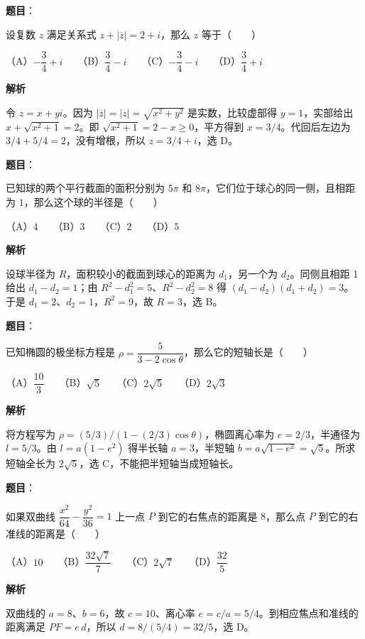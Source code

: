 \begin{answer}

\textbf{题目}：

设复数 $z$ 满足关系式 $z+|\overline z|=2+i$，那么 $z$ 等于\mbox{（　　）}

（A）$-\dfrac34+i$　　（B）$\dfrac34-i$　　（C）$-\dfrac34-i$　　（D）$\dfrac34+i$

\textbf{解析}

令 $z=x+yi$。因为 $|\overline z|=|z|=\sqrt{x^2+y^2}$ 是实数，比较虚部得 $y=1$，实部给出 $x+\sqrt{x^2+1}=2$。即 $\sqrt{x^2+1}=2-x\ge0$，平方得到 $x=3/4$。代回后左边为 $3/4+5/4=2$，没有增根，所以 $z=3/4+i$，选 D。


\end{answer}
\begin{answer}

\textbf{题目}：

已知球的两个平行截面的面积分别为 $5\pi$ 和 $8\pi$，它们位于球心的同一侧，且相距为 $1$，那么这个球的半径是\mbox{（　　）}

（A）$4$　　（B）$3$　　（C）$2$　　（D）$5$

\textbf{解析}

设球半径为 $R$，面积较小的截面到球心的距离为 $d_1$，另一个为 $d_2$。同侧且相距 1 给出 $d_1-d_2=1$；由 $R^2-d_1^2=5$、$R^2-d_2^2=8$ 得 $(d_1-d_2)(d_1+d_2)=3$。于是 $d_1=2$、$d_2=1$，$R^2=9$，故 $R=3$，选 B。


\end{answer}
\begin{answer}

\textbf{题目}：

已知椭圆的极坐标方程是 $\rho=\dfrac5{3-2\cos\theta}$，那么它的短轴长是\mbox{（　　）}

（A）$\dfrac{10}3$　　（B）$\sqrt5$　　（C）$2\sqrt5$　　（D）$2\sqrt3$

\textbf{解析}

将方程写为 $\rho=(5/3)/(1-(2/3)\cos\theta)$，椭圆离心率为 $e=2/3$，半通径为 $l=5/3$。由 $l=a(1-e^2)$ 得半长轴 $a=3$，半短轴 $b=a\sqrt{1-e^2}=\sqrt5$。所求短轴全长为 $2\sqrt5$，选 C，不能把半短轴当成短轴长。


\end{answer}
\begin{answer}

\textbf{题目}：

如果双曲线 $\dfrac{x^2}{64}-\dfrac{y^2}{36}=1$ 上一点 $P$ 到它的右焦点的距离是 $8$，那么点 $P$ 到它的右准线的距离是\mbox{（　　）}

（A）$10$　　（B）$\dfrac{32\sqrt7}{7}$　　（C）$2\sqrt7$　　（D）$\dfrac{32}{5}$

\textbf{解析}

双曲线的 $a=8$、$b=6$，故 $c=10$、离心率 $e=c/a=5/4$。到相应焦点和准线的距离满足 $PF=e\,d$，所以 $d=8/(5/4)=32/5$，选 D。


\end{answer}

